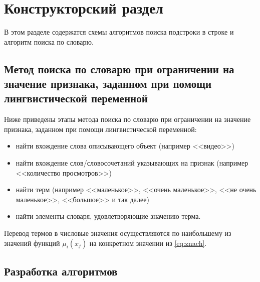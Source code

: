 \chapter{Конструкторский раздел}
В этом разделе содержатся схемы алгоритмов поиска подстроки в строке и алгоритм поиска по словарю.
\section{Метод поиска по словарю при ограничении на значение признака, заданном при помощи лингвистической переменной}

Ниже приведены этапы метода поиска по словарю при ограничении на значение признака, заданном при помощи лингвистической переменной:
\begin{itemize}[label=---]
\item найти вхождение слова описывающего объект (например <<видео>>)
\item найти вхождение слов/словосочетаний указывающих на признак (например <<количество просмотров>>)
\item найти терм (например <<маленькое>>, <<очень маленькое>>, <<не очень маленькое>>, <<большое>> и так далее)
\item найти элементы словаря, удовлетворяющие значению терма.
\end{itemize}

Перевод термов в числовые значения осуществляются по наибольшему из значений функций $\mu_i(x_j)$ на конкретном значении из \eqref{eq:znach}.

\section{Разработка алгоритмов}

